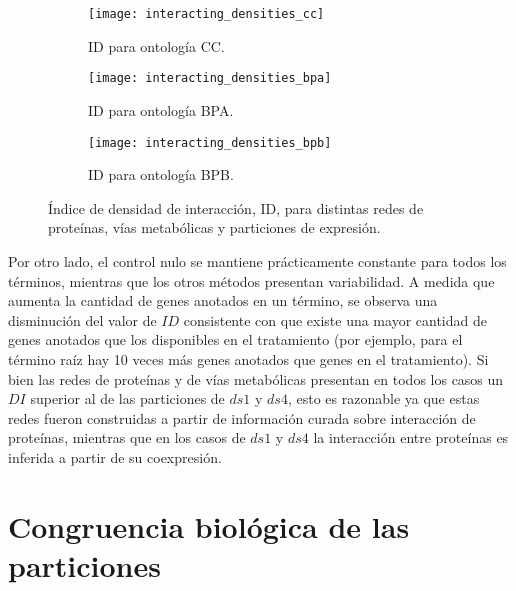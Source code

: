 \begin{figure*}[t!]
    \centering
    \begin{subfigure}[t]{0.5\textwidth}
    \centering
    \texttt{[image: interacting\_densities\_cc]}
    \caption{ID para ontología CC.}
    \end{subfigure}
    \begin{subfigure}[t]{0.5\textwidth}
    \centering
    \texttt{[image: interacting\_densities\_bpa]}
    \caption{ID para ontología BPA.}
    \end{subfigure}
    \begin{subfigure}[t]{0.5\textwidth}
    \centering
    \texttt{[image: interacting\_densities\_bpb]}
    \caption{ID para ontología BPB.}
    \end{subfigure}    
    \caption{Índice de densidad de interacción, ID, para distintas redes de proteínas, vías metabólicas y particiones de expresión.}
    \label{interacting_densities}
\end{figure*}

Por otro lado, el control nulo se mantiene prácticamente constante para todos los términos, mientras que los otros métodos presentan variabilidad. A medida que aumenta la cantidad de genes anotados en un término, se observa una disminución del valor de $ID$ consistente con que existe una mayor cantidad de genes anotados que los disponibles en el tratamiento (por ejemplo, para el término raíz hay 10 veces más genes anotados que genes en el tratamiento). Si bien las redes de proteínas y de vías metabólicas presentan en todos los casos un $DI$ superior al de las particiones de $ds1$ y $ds4$, esto es razonable ya que estas redes fueron construidas a partir de información curada sobre interacción de proteínas, mientras que en los casos de $ds1$ y $ds4$ la interacción entre proteínas es inferida a partir de su coexpresión.

\section{Congruencia biológica de las particiones}

